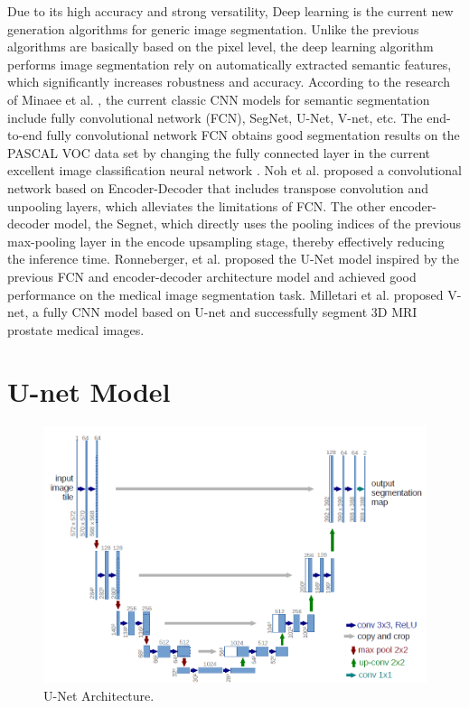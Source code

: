 \documentclass[12pt, a4paper]{article}
\begin{document}
	\par
	Due to its high accuracy and strong versatility, Deep learning is the current new generation algorithms for generic image segmentation. Unlike the previous algorithms are basically based on the pixel level, the deep learning algorithm performs image segmentation rely on automatically extracted semantic features, which significantly increases robustness and accuracy. According to the research of Minaee et al. \cite{minaee2020image}, the current classic CNN models for semantic segmentation include fully convolutional network (FCN), SegNet, U-Net, V-net, etc. The end-to-end fully convolutional network FCN obtains good segmentation results on the PASCAL VOC data set by changing the fully connected layer in the current excellent image classification neural network \cite{long2015fully}. Noh et al. \cite{noh2015learning} proposed a convolutional network based on Encoder-Decoder that includes transpose convolution and unpooling layers, which alleviates the limitations of FCN. The other encoder-decoder model, the Segnet, which directly uses the pooling indices of the previous max-pooling layer in the encode upsampling stage, thereby effectively reducing the inference time\cite{badrinarayanan2017segnet}. Ronneberger, et al. \cite{ronneberger2015u} proposed the U-Net model inspired by the previous FCN and encoder-decoder architecture model and achieved good performance on the medical image segmentation task. Milletari et al. \cite{milletari2016v} proposed V-net, a fully CNN model based on U-net and successfully segment 3D MRI prostate medical images. 

	\section{U-net Model} \justify
	\begin{figure}[h!] %
       \centering
	  \includegraphics[width=0.5\linewidth]{Capture.PNG}
	  \caption{U-Net Architecture.}
	  \label{fig:Unet}
	\end{figure}
\end{document}
